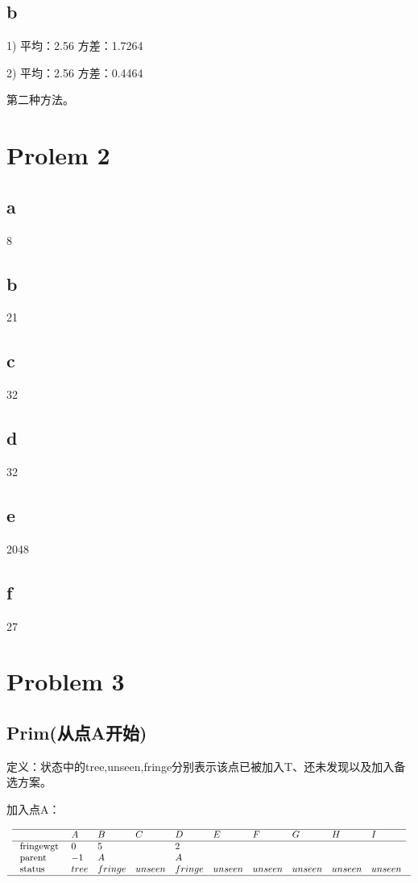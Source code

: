 \documentclass{article}
\begin{document}
\subsection*{b}
1) 平均：2.56 方差：1.7264

2) 平均：2.56 方差：0.4464

第二种方法。

\section*{Prolem 2}

\subsection*{a}
8

\subsection*{b}
21

\subsection*{c}
32

\subsection*{d}
32

\subsection*{e}
2048

\subsection*{f}
27

\section*{Problem 3}
\subsection*{Prim(从点A开始)}

定义：状态中的tree,unseen,fringe分别表示该点已被加入T、还未发现以及加入备选方案。

加入点A：

\begin{equation}
    \nonumber
    \begin{array}{l}
        \begin{array}{lllllllllll}
        \hline & A & B & C & D & E & F & G & H & I \\
        \hline \text { fringewgt } & 0 & 5 &  & 2 & &  &  &  &  \\
        \text { parent } & -1  & A &  & A & &  &  &  & \\
        \text { status } & tree & fringe & unseen & fringe & unseen & unseen  &  unseen  & unseen & unseen
        \end{array}\\
        \hline
    \end{array}
\end{equation}
\end{document}
